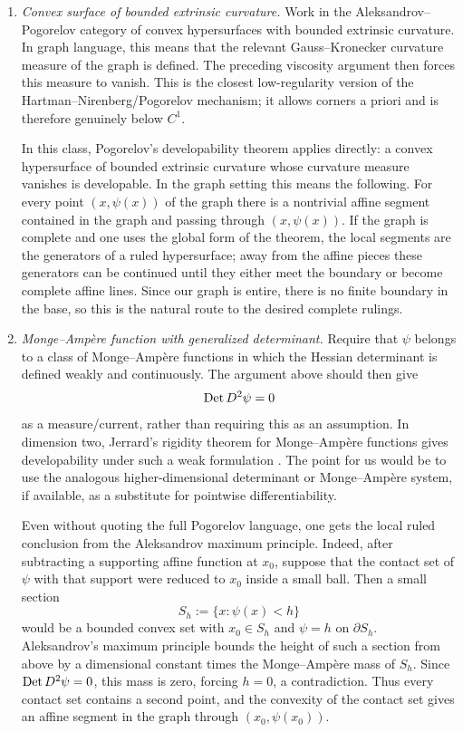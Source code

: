 \documentclass[11pt]{amsart}
\begin{document}
\begin{enumerate}
    \item {\it Convex surface of bounded extrinsic curvature.}  Work in the
    Aleksandrov--Pogorelov category of convex hypersurfaces with bounded
    extrinsic curvature.  In graph language, this means that the relevant
    Gauss--Kronecker curvature measure of the graph is defined.  The preceding
    viscosity argument then forces this measure to vanish.  This is the closest
    low-regularity version of the Hartman--Nirenberg/Pogorelov mechanism; it
    allows corners a priori and is therefore genuinely below $C^1$.

    In this class, Pogorelov's developability theorem applies directly: a
    convex hypersurface of bounded extrinsic curvature whose curvature measure
    vanishes is developable.  In the graph setting this means the following.
    For every point $(x,\psi(x))$ of the graph there is a nontrivial affine
    segment contained in the graph and passing through $(x,\psi(x))$.  If the
    graph is complete and one uses the global form of the theorem, the local
    segments are the generators of a ruled hypersurface; away from the affine
    pieces these generators can be continued until they either meet the boundary
    or become complete affine lines.  Since our graph is entire, there is no
    finite boundary in the base, so this is the natural route to the desired
    complete rulings.

    \item {\it Monge--Ampère function with generalized determinant.}  Require
    that $\psi$ belongs to a class of Monge--Ampère functions in which the
    Hessian determinant is defined weakly and continuously.  The argument above
    should then give
    \[
        {\rm Det}\,D^2\psi=0
    \]
    as a measure/current, rather than requiring this as an assumption.  In
    dimension two, Jerrard's rigidity theorem for Monge--Ampère functions gives
    developability under such a weak formulation \cite{Je10}.  The point for us
    would be to use the analogous higher-dimensional determinant or
    Monge--Ampère system, if available, as a substitute for pointwise
    differentiability.

    Even without quoting the full Pogorelov language, one gets the local
    ruled conclusion from the Aleksandrov maximum principle.  Indeed, after
    subtracting a supporting affine function at $x_0$, suppose that the contact
    set of $\psi$ with that support were reduced to $x_0$ inside a small ball.
    Then a small section
    \[
        S_h:=\{x:\psi(x)<h\}
    \]
    would be a bounded convex set with $x_0\in S_h$ and $\psi=h$ on
    $\partial S_h$.  Aleksandrov's maximum principle bounds the height of such
    a section from above by a dimensional constant times the Monge--Ampère mass
    of $S_h$.  Since ${\rm Det}\,D^2\psi=0$, this mass is zero, forcing
    $h=0$, a contradiction.  Thus every contact set contains a second point,
    and the convexity of the contact set gives an affine segment in the graph
    through $(x_0,\psi(x_0))$.


\end{enumerate}
\end{document}
